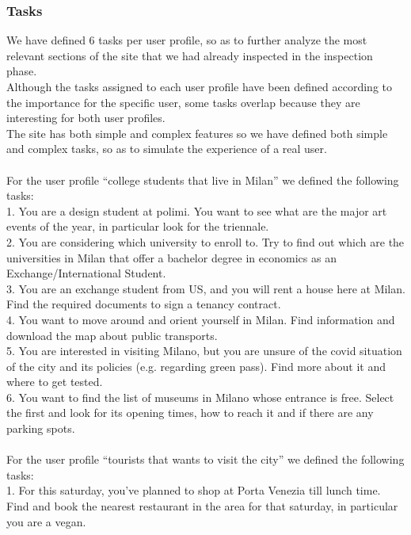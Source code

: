     \subsubsection{Tasks}
    We have defined 6 tasks per user profile, so as to further analyze the most relevant sections of the site that we had already inspected in the inspection phase.\\
    Although the tasks assigned to each user profile have been defined according to the importance for the specific user, some tasks overlap because they are interesting for both user profiles.\\
    The site has both simple and complex features so we have defined both simple and complex tasks, so as to simulate the experience of a real user.\\
    \\
    For the user profile “college students that live in Milan” we defined the following tasks:\\
    1. You are a design student at polimi. You want to see what are the major art events of the year, in particular look for the triennale.\\
    2. You are considering which university to enroll to. Try to find out which are the universities in Milan that offer a bachelor degree in economics as an Exchange/International Student.\\
    3. You are an exchange student from US, and you will rent a house here at Milan. Find the required documents to sign a tenancy contract.\\
    4. You want to move around and orient yourself in Milan. Find information and download the map about public transports.\\
    5. You are interested in visiting Milano, but you are unsure of the covid situation of the city and its policies (e.g. regarding green pass). Find more about it and where to get tested.\\
    6. You want to find the list of museums in Milano whose entrance is free. Select the first and look for its opening times, how to reach it and if there are any parking spots.\\
    \\
    For the user profile “tourists that wants to visit the city” we defined the following tasks:\\
    1. For this saturday, you've planned to shop at Porta Venezia till lunch time. Find and book the nearest restaurant in the area for that saturday, in particular you are a vegan.\\
